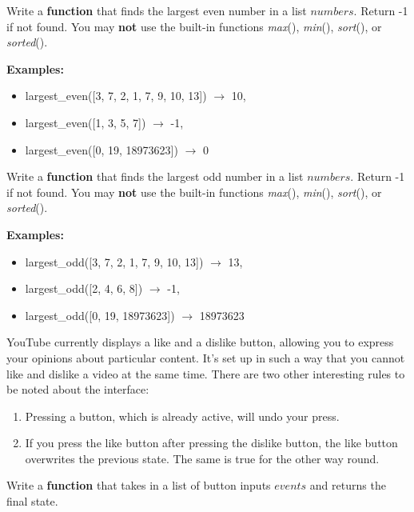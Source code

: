 	\item 
		Write a \textbf{function} that finds the largest even number in a list $numbers$. Return -1 if not found. 
		You may \textbf{not} use the built-in functions \textit{max}(), \textit{min}(), \textit{sort}(), or \textit{sorted}().

		\textbf{Examples:}		
		\begin{itemize}
			\item  largest\_even([3, 7, 2, 1, 7, 9, 10, 13]) $\rightarrow$ 10,
			\item  largest\_even([1, 3, 5, 7]) $\rightarrow$ -1,
			\item  largest\_even([0, 19, 18973623]) $\rightarrow$ 0
		\end{itemize}

	\item 
		Write a \textbf{function} that finds the largest odd number in a list $numbers$. Return -1 if not found. 
		You may \textbf{not} use the built-in functions \textit{max}(), \textit{min}(), \textit{sort}(), or \textit{sorted}().

		\textbf{Examples:}		
		\begin{itemize}
			\item  largest\_odd([3, 7, 2, 1, 7, 9, 10, 13]) $\rightarrow$ 13,
			\item  largest\_odd([2, 4, 6, 8]) $\rightarrow$ -1,
			\item  largest\_odd([0, 19, 18973623]) $\rightarrow$ 18973623
		\end{itemize}


	\item
		YouTube currently displays a like and a dislike button, allowing you to express your opinions about particular content. 
		It's set up in such a way that you cannot like and dislike a video at the same time.
		There are two other interesting rules to be noted about the interface:
		\begin{enumerate}
			\item Pressing a button, which is already active, will undo your press.
			\item If you press the like button after pressing the dislike button, the like button overwrites the previous  state. The same is true for the other way round.
		\end{enumerate}
		Write a \textbf{function} that takes in a list of button inputs $events$ and returns the final state.

